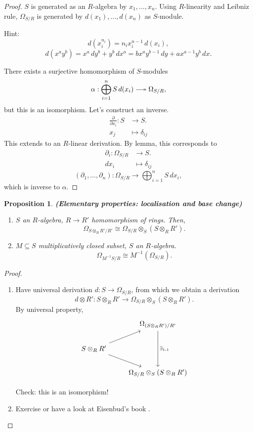 \documentclass[12pt]{article}
\newtheorem*{proposition}{Proposition}
\theoremstyle{definition}
\theoremstyle{remark}
\begin{document}
\begin{proof}
$S$ is generated as an $R$-algebra by $x_1,\ldots,x_n$. Using $R$-linearity and Leibniz rule, $\Omega_{S/R}$ is generated by $d(x_1),\ldots,d(x_n)$ as $S$-module.

Hint:
\[d(x_i^{n_i})=n_ix_i^{n-1}\,d(x_i),\]
\[d(x^ay^b)=x^a\,dy^b+y^b\,dx^a=bx^ay^{b-1}\,dy+ax^{a-1}y^b\,dx.\]

There exists a surjective homomorphism of $S$-modules
\[\alpha:\bigoplus_{i=1}^nS\,d(x_i)\relbar\joinrel\twoheadrightarrow\Omega_{S/R},\]
but this is an isomorphism. Let's construct an inverse.
\begin{align*}
\frac{\partial}{\partial x_i}:S&\longrightarrow S.\\
x_j&\longmapsto\delta_{ij}
\end{align*}
This extends to an $R$-linear derivation. By lemma, this corresponds to
\begin{align*}
\partial_i:\Omega_{S/R}&\longrightarrow S.\\
dx_i&\longmapsto\delta_{ij}
\end{align*}
\[(\partial_1,\ldots,\partial_n):\Omega_{S/R}\longrightarrow\bigoplus_{i=1}^nS\,dx_i,\]
which is inverse to $\alpha$.
\end{proof}

\begin{proposition}
\emph{\textbf{(Elementary properties: localisation and base change)}}
\begin{enumerate}[label=\arabic*)]
\item $S$ an $R$-algebra, $R\rightarrow R'$ homomorphism of rings. Then,
\[\Omega_{S\otimes_RR'/R'}\cong\Omega_{S/R}\otimes_S(S\otimes_RR').\]

\item $M\subseteq S$ multiplicatively closed subset, $S$ an $R$-algebra.
\[\Omega_{M^{-1}S/R}\cong M^{-1}(\Omega_{S/R}).\]
\end{enumerate}
\end{proposition}

\begin{proof}
\begin{enumerate}[label=\arabic*)]
\item Have universal derivation $d:S\rightarrow\Omega_{S/R}$, from which we obtain a derivation
\[d\otimes R':S\otimes_RR'\longrightarrow\Omega_{S/R}\otimes_S(S\otimes_RR').\]
By universal property,
\[
\begin{tikzcd}
&\Omega_{(S\otimes_RR')/R'}\arrow[dd,"\exists_{1\text{-}1}"]\\
S\otimes_RR'\arrow[ru]\arrow[rd]\\
&\Omega_{S/R}\otimes_S(S\otimes_RR')
\end{tikzcd}
\]

Check: this is an isomorphism!

\item Exercise or have a look at Eisenbud's book \cite{eisenbud2013commutative}.
\end{enumerate}
\end{proof}
\end{document}
